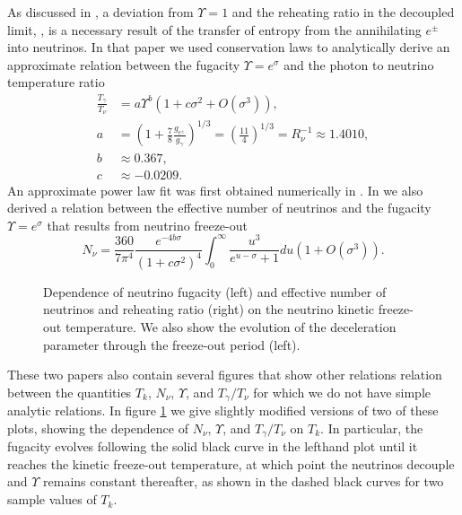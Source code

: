 As discussed in  \cite{Birrell:2013_2}, a deviation from $\Upsilon=1$ and the reheating ratio in the decoupled limit, , is a necessary result of the transfer of entropy from the annihilating $e^\pm$ into neutrinos.  In that paper we used conservation laws to analytically derive an approximate relation between the fugacity $\Upsilon=e^\sigma$ and the photon to neutrino temperature ratio
\begin{align}\label{Upsilon_ratio}
\frac{T_\gamma}{T_\nu}&=a\Upsilon^{b}\left(1+c\sigma^2+O(\sigma^3)\right),\\
\label{value_a}
a&=\left(1+\frac{7}{8}\frac{g_{e^\pm}}{g_\gamma}\right)^{1/3}=\left(\frac{11}{4}\right)^{1/3}=R_\nu^{-1}\approx 1.4010,\\
\label{value_b}
b&\approx 0.367,\\
c&\approx -0.0209.
\end{align}
An approximate power law fit was first obtained numerically in \cite{Birrell2013}. In \cite{Birrell:2013_2} we also derived a relation between the effective number of neutrinos and the fugacity $\Upsilon=e^\sigma$ that results from neutrino freeze-out
\begin{equation}\label{N_nu_approx}
N_\nu=\frac{360}{7\pi^4}\frac{e^{-4b\sigma}}{(1+c\sigma^2)^4}\int_0^\infty \frac{u^3}{e^{u-\sigma}+1}du\left(1+O(\sigma^3)\right).
\end{equation}


\begin{figure}\label{fig:Tk_dependence}
\begin{minipage}{\linewidth}
\caption{Dependence of neutrino fugacity (left) and effective number of neutrinos and reheating ratio (right) on the neutrino kinetic freeze-out temperature. We also show the evolution of the deceleration parameter through the freeze-out period (left).}
\end{minipage}
 \end{figure}


These two papers also contain several figures that show other relations relation between the quantities $T_k$, $N_\nu$, $\Upsilon$, and $T_\gamma/T_\nu$ for which we do not have simple analytic relations. In figure \ref{fig:Tk_dependence} we give slightly modified versions of two of these plots, showing the dependence of $N_\nu$, $\Upsilon$, and $T_\gamma/T_\nu$ on $T_k$.  In particular, the fugacity evolves following the solid black curve in the lefthand plot until it reaches the kinetic freeze-out temperature, at which point the neutrinos decouple and $\Upsilon$ remains constant thereafter, as shown in the dashed black curves for two sample values of $T_k$.

